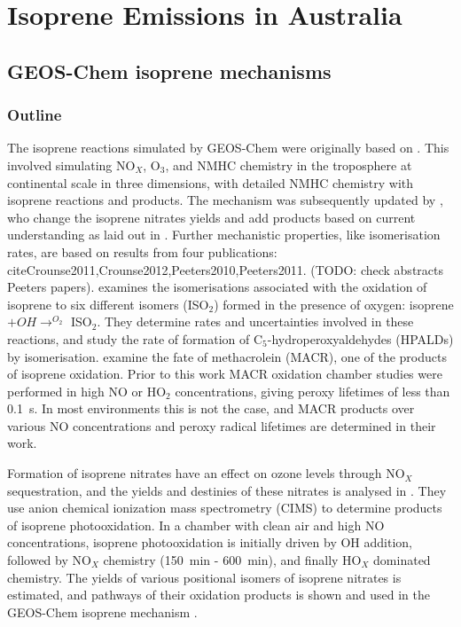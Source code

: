 
\chapter{Isoprene Emissions in Australia} %
\label{ch_isop}

\section{GEOS-Chem isoprene mechanisms}
\label{ch_isop:sec:GEOSChemMechanisms}
  \subsection{Outline}
    The isoprene reactions simulated by GEOS-Chem were originally based on \cite{Horowitz1998}.
    This involved simulating NO$_X$, O$_3$, and NMHC chemistry in the troposphere at continental scale in three dimensions, with detailed NMHC chemistry with isoprene reactions and products.
    The mechanism was subsequently updated by \citet{Mao2013}, who change the isoprene nitrates yields and add products based on current understanding as laid out in \citet{Paulot2009a,Paulot2009b}.
    Further mechanistic properties, like isomerisation rates, are based on results from four publications: cite{Crounse2011,Crounse2012,Peeters2010,Peeters2011}.
    (TODO: check abstracts Peeters papers).
    \cite{Crounse2011} examines the isomerisations associated with the oxidation of isoprene to six different isomers (ISO$_2$) formed in the presence of oxygen: isoprene $ + OH \rightarrow^{O_2} $ ISO$_2$.
    They determine rates and uncertainties involved in these reactions, and study the rate of formation of C$_5$-hydroperoxyaldehydes (HPALDs) by isomerisation.
    \cite{Crounse2012} examine the fate of methacrolein (MACR), one of the products of isoprene oxidation. 
    Prior to this work MACR oxidation chamber studies were performed in high NO or HO$_2$ concentrations, giving peroxy lifetimes of less than 0.1~s.
    In most environments this is not the case, and MACR products over various NO concentrations and peroxy radical lifetimes are determined in their work.
    
    Formation of isoprene nitrates have an effect on ozone levels through NO$_X$ sequestration, and the yields and destinies of these nitrates is analysed in \citet{Paulot2009a}. 
    They use anion chemical ionization mass spectrometry (CIMS) to determine products of isoprene photooxidation.
    In a chamber with clean air and high NO concentrations, isoprene photooxidation is initially driven by OH addition, followed by NO$_X$ chemistry (150~min - 600~min), and finally HO$_X$ dominated chemistry.
    The yields of various positional isomers of isoprene nitrates is estimated, and pathways of their oxidation products is shown and used in the GEOS-Chem isoprene mechanism \citep{Paulot2009a,Mao2013}. 
    
